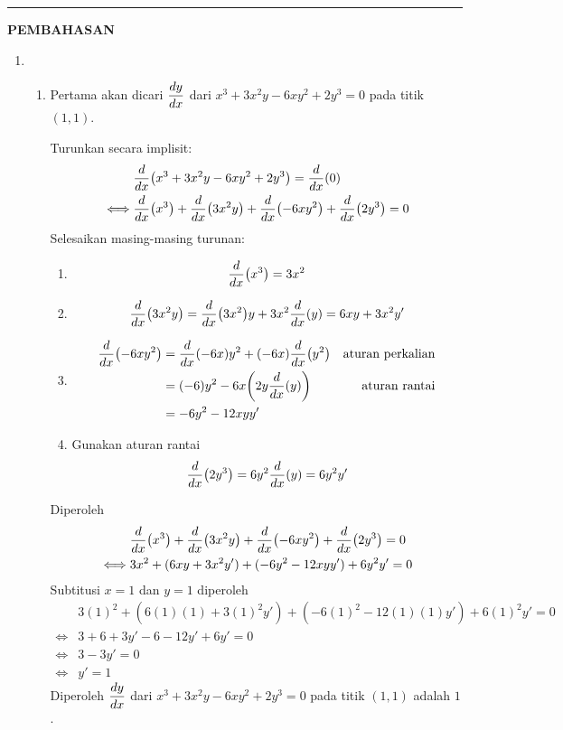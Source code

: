 \vspace{0.2cm}
\hrule height 1pt
\vspace{0.5cm}
\begin{center}
    \textbf{\large{PEMBAHASAN}}
\end{center}
\begin{enumerate}[leftmargin=*, label={\arabic*}.]
\item 
\begin{enumerate}[label={\alph*}.]
    \item Pertama akan dicari $\displaystyle\frac{dy}{dx}$ dari 
    $x^{3}+3x^{2}y-6xy^{2}+2y^{3}=0$ pada titik $(1,1)$.

    Turunkan secara implisit:
    \begin{align*}
        &\drv{x}{x^{3}+3x^{2}y-6xy^{2}+2y^{3}}=\drv{x}{0}\\
        \iff &\drv{x}{x^{3}}+\drv{x}{3x^{2}y}+\drv{x}{-6xy^{2}}
        +\drv{x}{2y^{3}} = 0
    \end{align*}
    Selesaikan masing-masing turunan:
    \begin{enumerate}[label={\arabic*})]
    \item \[
    \drv{x}{x^{3}} = 3x^{2}
    \]
    \item \[
    \drv{x}{3x^{2}y} = \drv{x}{3x^{2}}y+3x^{2}\drv{x}{y} = 6xy+3x^{2}y'
    \]
    \item 
    \begin{align*}
        \drv{x}{-6xy^{2}} &= \drv{x}{-6x}y^{2} + (-6x)\drv{x}{y^{2}}
        &\text{aturan perkalian}\\
        &=(-6)y^{2}-6x\bracket*{2y\drv{x}{y}}
        &\text{aturan rantai}\\
        &=-6y^{2}-12xyy'
    \end{align*}
    \item Gunakan aturan rantai
    \begin{align*}
        \drv{x}{2y^{3}} = 6y^{2}\drv{x}{y} = 6y^{2}y'
    \end{align*}
    \end{enumerate}
    Diperoleh
    \begin{align*}
        &\drv{x}{x^{3}}+\drv{x}{3x^{2}y}+\drv{x}{-6xy^{2}}+\drv{x}{2y^{3}} = 0\\
        \iff &3x^{2}+(6xy+3x^{2}y')+(-6y^2-12xyy')+6y^{2}y'=0
    \end{align*}
    Subtitusi $x=1$ dan $y=1$ diperoleh
    \begin{align*}
        &3(1)^{2}+(6(1)(1)+3(1)^{2}y')+(-6(1)^{2}-12(1)(1)y')+6(1)^2y'=0\\
        \iff &3+6+3y'-6-12y'+6y'=0\\
        \iff &3-3y'=0\\
        \iff &y' = 1
    \end{align*}
    Diperoleh $\displaystyle\frac{dy}{dx}$ dari 
    $x^{3}+3x^{2}y-6xy^{2}+2y^{3}=0$ pada titik $(1,1)$ adalah $1$.


\end{enumerate}
\end{enumerate}
